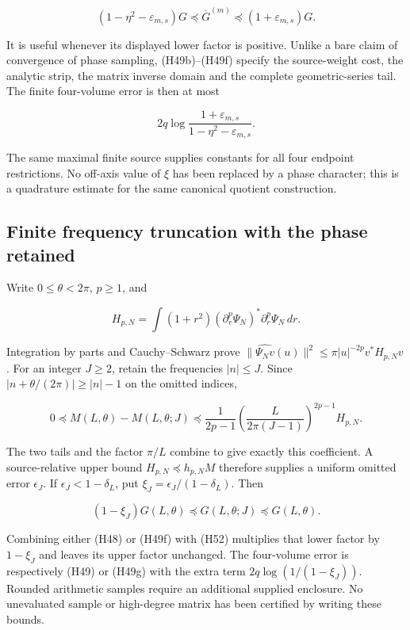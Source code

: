 \documentclass[
]{article}
\begin{document}
\[
 (1-\eta^2-\varepsilon_{m,s})G
 \preceq\overline G^{(m)}
 \preceq(1+\varepsilon_{m,s})G.
 \tag{H49f}
\]

It is useful whenever its displayed lower factor is positive. Unlike a
bare claim of convergence of phase sampling, (H49b)--(H49f) specify the
source-weight cost, the analytic strip, the matrix inverse domain and
the complete geometric-series tail. The finite four-volume error is then
at most

\[
 2q\log\frac{1+\varepsilon_{m,s}}
 {1-\eta^2-\varepsilon_{m,s}}.
 \tag{H49g}
\]

The same maximal finite source supplies constants for all four endpoint
restrictions. No off-axis value of \(\xi\) has been replaced by a phase
character; this is a quadrature estimate for the same canonical quotient
construction.

\subsection{Finite frequency truncation with the phase
retained}\label{finite-frequency-truncation-with-the-phase-retained}

Write \(0\leq\theta<2\pi\), \(p\geq1\), and

\[
 H_{p,N}=\int(1+r^2)(\partial_r^p\Psi_N)^*\partial_r^p\Psi_N\,dr.
 \tag{H50}
\]

Integration by parts and Cauchy--Schwarz prove
\(\|\widehat{\Psi_Nv}(u)\|^2\leq\pi|u|^{-2p}v^*H_{p,N}v\). For an
integer \(J\geq2\), retain the frequencies \(|n|\leq J\). Since
\(|n+\theta/(2\pi)|\geq |n|-1\) on the omitted indices,

\[
 0\preceq M(L,\theta)-M(L,\theta;J)
 \preceq
 \frac1{2p-1}\left(\frac{L}{2\pi(J-1)}\right)^{2p-1}H_{p,N}.
 \tag{H51}
\]

The two tails and the factor \(\pi/L\) combine to give exactly this
coefficient. A source-relative upper bound \(H_{p,N}\preceq h_{p,N}M\)
therefore supplies a uniform omitted error \(\epsilon_J\). If
\(\epsilon_J<1-\delta_L\), put \(\xi_J=\epsilon_J/(1-\delta_L)\). Then

\[
 (1-\xi_J)G(L,\theta)\preceq G(L,\theta;J)\preceq G(L,\theta).
 \tag{H52}
\]

Combining either (H48) or (H49f) with (H52) multiplies that lower factor
by \(1-\xi_J\) and leaves its upper factor unchanged. The four-volume
error is respectively (H49) or (H49g) with the extra term
\(2q\log(1/(1-\xi_J))\). Rounded arithmetic samples require an
additional supplied enclosure. No unevaluated sample or high-degree
matrix has been certified by writing these bounds.
\end{document}
